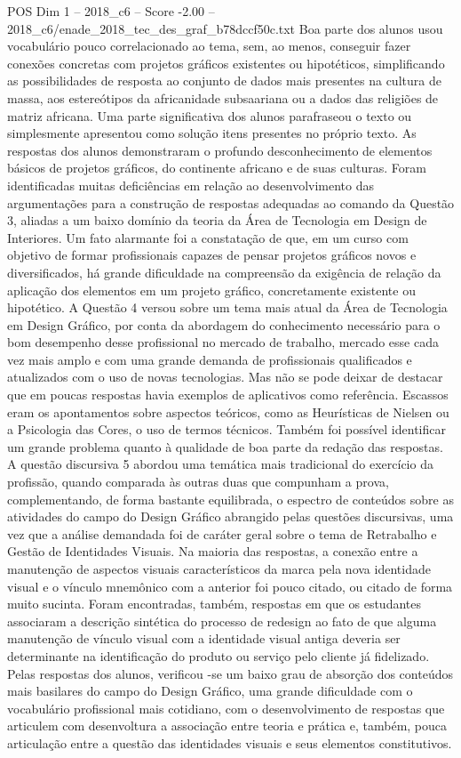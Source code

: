 \begin{textsample}{POS Dim 1 – 2018\_c6 – Score -2.00 – 2018\_c6/enade\_2018\_tec\_des\_graf\_b78dccf50c.txt}
Boa parte dos alunos usou vocabulário pouco correlacionado ao tema, sem, ao menos, conseguir fazer conexões concretas com projetos gráficos existentes ou hipotéticos, simplificando as possibilidades de resposta ao conjunto de dados mais presentes na cultura de massa, aos estereótipos da africanidade subsaariana ou a dados das religiões de matriz africana.
Uma parte significativa dos alunos parafraseou o texto ou simplesmente apresentou como solução itens presentes no próprio texto.
As respostas dos alunos demonstraram o profundo desconhecimento de elementos básicos de projetos gráficos, do continente africano e de suas culturas.
Foram identificadas muitas deficiências em relação ao desenvolvimento das argumentações para a construção de respostas adequadas ao comando da Questão 3, aliadas a um baixo domínio da teoria da Área de Tecnologia em Design de Interiores.
Um fato alarmante foi a constatação de que, em um curso com objetivo de formar profissionais capazes de pensar projetos gráficos novos e diversificados, há grande dificuldade na compreensão da exigência de relação da aplicação dos elementos em um projeto gráfico, concretamente existente ou hipotético.
A Questão 4 versou sobre um tema mais atual da Área de Tecnologia em Design Gráfico, por conta da abordagem do conhecimento necessário para o bom desempenho desse profissional no mercado de trabalho, mercado esse cada vez mais amplo e com uma grande demanda de profissionais qualificados e atualizados com o uso de novas tecnologias.
Mas não se pode deixar de destacar que em poucas respostas havia exemplos de aplicativos como referência.
Escassos eram os apontamentos sobre aspectos teóricos, como as Heurísticas de Nielsen ou a Psicologia das Cores, o uso de termos técnicos.
Também foi possível identificar um grande problema quanto à qualidade de boa parte da redação das respostas.
A questão discursiva 5 abordou uma temática mais tradicional do exercício da profissão, quando comparada às outras duas que compunham a prova, complementando, de forma bastante equilibrada, o espectro de conteúdos sobre as atividades do campo do Design Gráfico abrangido pelas questões discursivas, uma vez que a análise demandada foi de caráter geral sobre o tema de Retrabalho e Gestão de Identidades Visuais.
Na maioria das respostas, a conexão entre a manutenção de aspectos visuais característicos da marca pela nova identidade visual e o vínculo mnemônico com a anterior foi pouco citado, ou citado de forma muito sucinta.
Foram encontradas, também, respostas em que os estudantes associaram a descrição sintética do processo de redesign ao fato de que alguma manutenção de vínculo visual com a identidade visual antiga deveria ser determinante na identificação do produto ou serviço pelo cliente já fidelizado.
Pelas respostas dos alunos, verificou -se um baixo grau de absorção dos conteúdos mais basilares do campo do Design Gráfico, uma grande dificuldade com o vocabulário profissional mais cotidiano, com o desenvolvimento de respostas que articulem com desenvoltura a associação entre teoria e prática e, também, pouca articulação entre a questão das identidades visuais e seus elementos constitutivos.

\end{textsample}
